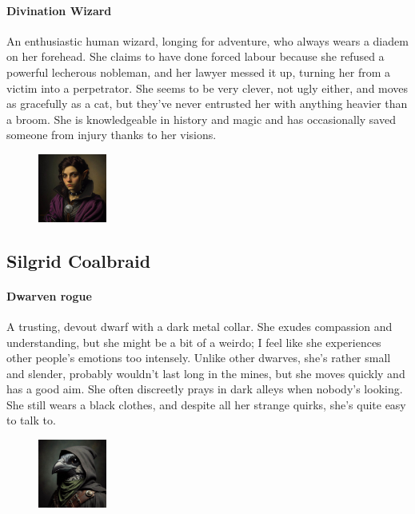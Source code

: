 \documentclass[10pt,twoside,twocolumn,openany,nodepracetedcode]{dndbook}
\begin{document}
\begin{onecolumn}
  \paragraph{Divination Wizard}
  An enthusiastic human wizard, longing for adventure, who always wears a diadem on her forehead. She claims to have done forced labour because she refused a powerful lecherous nobleman, and her lawyer messed it up, turning her from a victim into a perpetrator. She seems to be very clever, not ugly either, and moves as gracefully as a cat, but they've never entrusted her with anything heavier than a broom. She is knowledgeable in history and magic and has occasionally saved someone from injury thanks to her visions.


  \begin{figure}
    \begin{center}
      \includegraphics[width=0.2\textwidth]{img/silgrid}
    \end{center}
  \end{figure}
  \subsection{Silgrid Coalbraid}
  \paragraph{Dwarven rogue}
  A trusting, devout dwarf with a dark metal collar. She exudes compassion and understanding, but she might be a bit of a weirdo; I feel like she experiences other people's emotions too intensely. Unlike other dwarves, she's rather small and slender, probably wouldn't last long in the mines, but she moves quickly and has a good aim. She often discreetly prays in dark alleys when nobody's looking. She still wears a black clothes, and despite all her strange quirks, she's quite easy to talk to.


  \begin{figure}
    \begin{center}
      \includegraphics[width=0.2\textwidth]{img/sally}
    \end{center}
  \end{figure}

\end{onecolumn}
\end{document}
